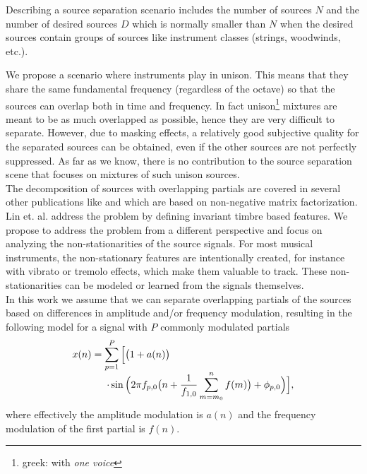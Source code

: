 Describing a source separation scenario includes the number of sources $N$ and the number of desired sources $D$ which is normally smaller than $N$ when the desired sources contain groups of sources like instrument classes (strings, woodwinds, etc.).

We propose a scenario where instruments play in unison. This means that they share the same fundamental frequency (regardless of the octave) so that the sources can overlap both in time and frequency. In fact unison\footnote{greek: with \emph{one voice}} mixtures are meant to be as much overlapped as possible, hence they are very difficult to separate. However, due to masking effects, a relatively good subjective quality for the separated sources can be obtained, even if the other sources are not perfectly suppressed.
As far as we know, there is no contribution to the source separation scene that focuses on mixtures of such unison sources. \\

The decomposition of sources with overlapping partials are covered in several other publications like \cite{nakano10} and \cite{smaragdis08} which are based on non-negative matrix factorization. Lin et. al. \cite{lintimbre13} address the problem by defining invariant timbre based features. We propose to address the problem from a different perspective and focus on analyzing the non-stationarities of the source signals. For most musical instruments, the non-stationary features are intentionally created, for instance with vibrato or tremolo effects, which make them valuable to track. These non-stationarities can be modeled or learned from the signals themselves. \\

In this work we assume that we can separate overlapping partials of the sources based on differences in amplitude and/or frequency modulation, resulting in the following model for a signal with $P$ commonly modulated partials
\begin{equation}
  \begin{array}{l}
   x(n) = \displaystyle \sum_{p=1}^{P} \Big[\big(1 + a(n)\big) \\
   \hspace{3.5em}\displaystyle \cdot\sin \Big(2\pi f_{p,0}\big(n + \frac{1}{f_{1,0}} \sum_{m=m_0}^{n}{f(m)} \big) + \phi_{p,0} \Big)\Big] ,
  \end{array}
\end{equation}
where effectively the amplitude modulation is $a(n)$ and the frequency modulation of the first partial is $f(n)$.

